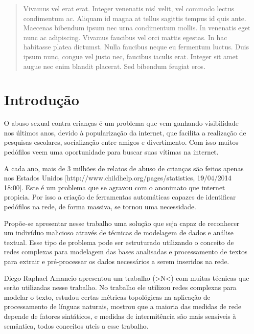 \documentclass[xindy,rascunho]{fei}
\begin{document}
\begin{abstract}
Vivamus vel erat erat. Integer venenatis nisl velit, vel commodo lectus condimentum ac. Aliquam id magna at tellus sagittis tempus id quis ante. Maecenas bibendum ipsum nec urna condimentum mollis. In venenatis eget nunc ac adipiscing. Vivamus faucibus vel orci mattis egestas. In hac habitasse platea dictumst. Nulla faucibus neque eu fermentum luctus. Duis ipsum nunc, congue vel justo nec, faucibus iaculis erat. Integer sit amet augue nec enim blandit placerat. Sed bibendum feugiat eros.
\end{abstract}

\tableofcontents

\chapter{Introdução}

O abuso sexual contra crianças é um problema que vem ganhando visibilidade nos últimos anos, devido à popularização da internet, que facilita a realização de pesquisas escolares, socialização entre amigos e divertimento. Com isso muitos pedófilos veem uma oportunidade para buscar suas vítimas na internet.

A cada ano, mais de 3 milhões de relatos de abuso de crianças são feitos apenas nos Estados Unidos [http://www.childhelp.org/pages/statistics, 19/04/2014 18:00]. Este é um problema que se agravou com o anonimato que internet propicia. Por isso a criação de ferramentas automáticas capazes de identificar pedófilos na rede, de forma massiva, se tornou uma necessidade.

Propõe-se apresentar nesse trabalho uma solução que seja capaz de reconhecer um indivíduo malicioso através de técnicas de modelagem de dados e análise textual. Esse tipo de problema pode ser estruturado utilizando o conceito de redes complexas para modelagem das bases analisadas e processamento de textos para extrair e pré-processar os dados necessários a serem inseridos na rede.

Diego Raphael Amancio apresentou um trabalho (>N<) com muitas técnicas que serão utilizadas nesse trabalho. No trabalho ele utilizou redes complexas para modelar o texto, estudou certas métricas topológicas na aplicação de processamento de línguas naturais, mostrou que a maioria das medidas de rede depende de fatores sintáticos, e medidas de intermitência são mais sensíveis à semântica, todos conceitos uteis a esse trabalho.
\end{document}

